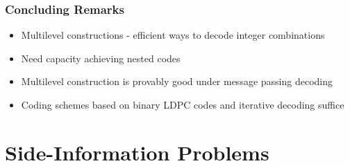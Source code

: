 \documentclass[10pt]{beamer}
\begin{document}
\begin{frame}\frametitle{Concluding Remarks}
    \begin{itemize}
        \item Multilevel constructions - efficient ways to decode integer combinations
               \vspace{5pt}
        \item Need capacity achieving nested codes
                \vspace{5pt}
        \item Multilevel construction is provably good under message passing decoding
               \vspace{5pt}
               \pause
        \item Coding schemes based on {\alert binary LDPC codes and iterative decoding} suffice
    \end{itemize}
\end{frame}

\section{Side-Information Problems}
\end{document}
